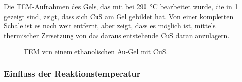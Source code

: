 	Die TEM-Aufnahmen des Gels, das mit  bei \SI{290}{\degreeCelsius} bearbeitet wurde, die in \cref{fig:E-Cu} gezeigt sind, zeigt, dass sich CuS am Gel gebildet hat.
	Von einer kompletten Schale ist es noch weit entfernt, aber zeigt, dass es möglich ist, mittels  thermischer Zersetzung von  das daraus entstehende CuS daran anzulagern.
	
	\begin{figure}[H]
		\centering
		\caption{TEM von einem ethanolischen Au-Gel mit CuS.}
		\label{fig:E-Cu}
	\end{figure}


	\subsubsection{Einfluss der Reaktionstemperatur}
		
